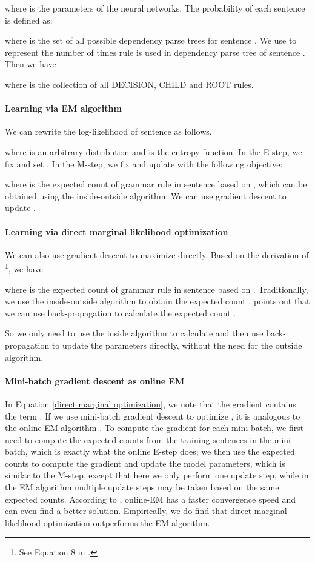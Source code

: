 \documentclass[11pt]{article}
\begin{document}
where  is the parameters of the neural networks. The probability of each sentence  is defined as:

where  is the set of all possible dependency parse trees for sentence .  We use  to represent the number of times rule  is used in dependency parse tree  of sentence . Then we have 

where  is the collection of all DECISION, CHILD and ROOT rules.

\paragraph{Learning via EM algorithm}
We can rewrite the log-likelihood of sentence  as follows.

where  is an arbitrary distribution and  is the entropy function. In the E-step, we fix  and set . In the M-step, we fix  and update  with the following objective:

where  is the expected count of grammar rule  in sentence  based on , which can be obtained using the inside-outside algorithm. We can use gradient descent to update . 


\paragraph{Learning via direct marginal likelihood optimization} 
We can also use gradient descent to maximize  directly. Based on the derivation of \footnote{See Equation 8 in .}, we have 

where  is the expected count of grammar rule  in sentence  based on . Traditionally, we use the inside-outside algorithm to obtain the expected count .  points out that we can use back-propagation to calculate the expected count .

So we only need to use the inside algorithm to calculate  and then use back-propagation to update the parameters directly, without the need for the outside algorithm. 

\paragraph{Mini-batch gradient descent as online EM}
In Equation \ref{direct marginal optimization}, we note that the gradient contains the term . If we use mini-batch gradient descent to optimize , it is analogous to the online-EM algorithm \cite{Liang2009OnlineEF}. To compute the gradient for each mini-batch, we first need to compute the expected counts from the training sentences in the mini-batch, which is exactly what the online E-step does; we then use the expected counts  to compute the gradient and update the model parameters, which is similar to the M-step, except that here we only perform one update step, while in the EM algorithm multiple update steps may be taken based on the same expected counts. According to , online-EM has a faster convergence speed and can even find a better solution. Empirically, we do find that direct marginal likelihood optimization outperforms the EM algorithm.
\end{document}
